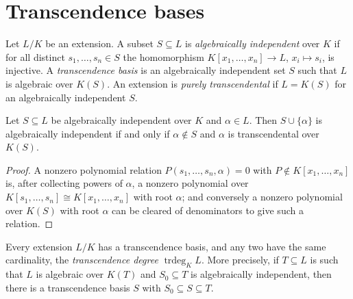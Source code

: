 \section{Transcendence bases}\label{fields:section-transcendence}

\begin{definition}\label{fields:definition-transcendence-basis}
Let $L/K$ be an extension. A subset $S \subseteq L$ is \emph{algebraically independent} over $K$ if
for all distinct $s_1, \ldots, s_n \in S$ the homomorphism $K[x_1, \ldots, x_n] \to L$, $x_i \mapsto s_i$, is
injective. A \emph{transcendence basis} is an algebraically independent set $S$ such that $L$ is
algebraic over $K(S)$. An extension is \emph{purely transcendental} if $L = K(S)$ for an
algebraically independent $S$.
\end{definition}

\begin{lemma}\label{fields:lemma-transcendence-exchange}
Let $S \subseteq L$ be algebraically independent over $K$ and $\alpha \in L$. Then $S \cup \{\alpha\}$ is
algebraically independent if and only if $\alpha \notin S$ and $\alpha$ is transcendental over $K(S)$.
\end{lemma}

\begin{proof}
A nonzero polynomial relation $P(s_1, \ldots, s_n, \alpha) = 0$ with $P \notin K[x_1, \ldots, x_n]$ is, after
collecting powers of $\alpha$, a nonzero polynomial over $K[s_1, \ldots, s_n] \cong K[x_1, \ldots, x_n]$ with root
$\alpha$; and conversely a nonzero polynomial over $K(S)$ with root $\alpha$ can be cleared of
denominators to give such a relation.
\end{proof}

\begin{theorem}\label{fields:theorem-transcendence-degree}
Every extension $L/K$ has a transcendence basis, and any two have the same cardinality, the
\emph{transcendence degree} $\operatorname{trdeg}_K L$. More precisely, if $T \subseteq L$ is such that $L$ is
algebraic over $K(T)$ and $S_0 \subseteq T$ is algebraically independent, then there is a
transcendence basis $S$ with $S_0 \subseteq S \subseteq T$.
\end{theorem}

